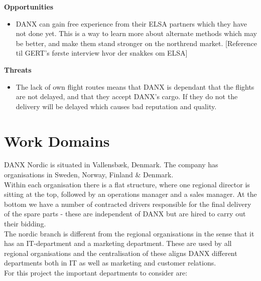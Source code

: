 \textbf{Opportunities}
\begin{itemize}
\item DANX can gain free experience from their ELSA partners which they have not done yet. This is a way to learn more about alternate methods which may be better, and make them stand stronger on the northrend market. [Reference til GERT’s første interview hvor der snakkes om ELSA]
\end{itemize}


\textbf{Threats}
\begin{itemize}
\item The lack of own flight routes means that DANX is dependant that the flights are not delayed, and that they accept DANX’s cargo. If they do not the delivery will be delayed which causes bad reputation and quality.
\end{itemize}




\section*{Work Domains}

DANX Nordic is situated in Vallensbæk, Denmark. The company has organisations in Sweden, Norway, Finland \& Denmark.\\

Within each organisation there is a flat structure, where one regional director is sitting at the top, followed by an operations manager and a sales manager. At the bottom we have a number of contracted drivers responsible for the final delivery of the spare parts - these are independent of DANX but are hired to carry out their bidding.\\

The nordic branch is different from the regional organisations in the sense that it has an IT-department and a marketing department. These are used by all regional organisations and the centralisation of these aligns DANX different departments both in IT as well as marketing and customer relations.\\

For this project the important departments to consider are:

